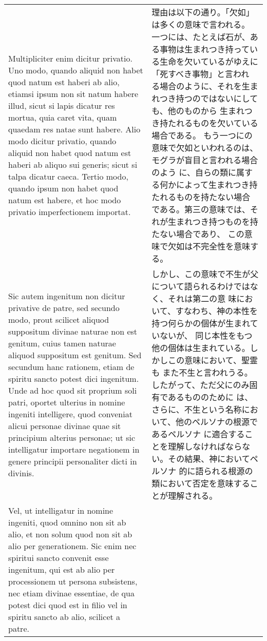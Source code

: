 \documentclass[10pt]{jsarticle} %
\begin{document}
\begin{longtable}{p{21em}p{21em}}
Multipliciter enim dicitur privatio. Uno modo, quando
aliquid non habet quod natum est haberi ab alio, etiamsi ipsum non sit
natum habere illud, sicut si lapis dicatur res mortua, quia caret
vita, quam quaedam res natae sunt habere. Alio modo dicitur privatio,
quando aliquid non habet quod natum est haberi ab aliquo sui generis;
sicut si talpa dicatur caeca. Tertio modo, quando ipsum non habet quod
natum est habere, et hoc modo privatio imperfectionem importat. 

&

理由は以下の通り。「欠如」は多くの意味で言われる。
一つには、たとえば石が、ある事物は生まれつき持っている生命を欠いているがゆえに「死すべき事物」と言われ
 る場合のように、それを生まれつき持つのではないにしても、他のものから
 生まれつき持たれるものを欠いている場合である。
もう一つにの意味で欠如といわれるのは、モグラが盲目と言われる場合のよう
 に、自らの類に属する何かによって生まれつき持たれるものを持たない場合
 である。第三の意味では、それが生まれつき持つものを持たない場合であり、
 この意味で欠如は不完全性を意味する。


\\


Sic
autem ingenitum non dicitur privative de patre, sed secundo modo,
prout scilicet aliquod suppositum divinae naturae non est genitum,
cuius tamen naturae aliquod suppositum est genitum. Sed secundum hanc
rationem, etiam de spiritu sancto potest dici ingenitum. Unde ad hoc
quod sit proprium soli patri, oportet ulterius in nomine ingeniti
intelligere, quod conveniat alicui personae divinae quae sit
principium alterius personae; ut sic intelligatur importare negationem
in genere principii personaliter dicti in divinis. 

&

しかし、この意味で不生が父について語られるわけではなく、それは第二の意
 味において、すなわち、神の本性を持つ何らかの個体が生まれていないが、
 同じ本性をもつ他の個体は生まれている。しかしこの意味において、聖霊も
 また不生と言われうる。したがって、ただ父にのみ固有であるもののために
 は、さらに、不生という名称において、他のペルソナの根源であるペルソナ
 に適合することを理解しなければならない。その結果、神においてペルソナ
 的に語られる根源の類において否定を意味することが理解される。


\\


Vel, ut
intelligatur in nomine ingeniti, quod omnino non sit ab alio, et non
solum quod non sit ab alio per generationem. Sic enim nec spiritui
sancto convenit esse ingenitum, qui est ab alio per processionem ut
persona subsistens, nec etiam divinae essentiae, de qua potest dici
quod est in filio vel in spiritu sancto ab alio, scilicet a patre.



\end{longtable}
\end{document}
